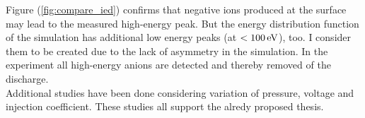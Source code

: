 Figure (\ref{fig:compare_ied}) confirms that negative ions produced at the surface may lead to the measured high-energy peak. 
But the energy distribution function of the simulation has additional low energy peaks (at $< 100\,\mathrm{eV}$), too.
I consider them to be created due to the lack of asymmetry in the simulation.
In the experiment all high-energy anions are detected and thereby removed of the discharge.\\
Additional studies have been done considering variation of pressure, voltage and injection coefficient.
These studies all support the alredy proposed thesis.


